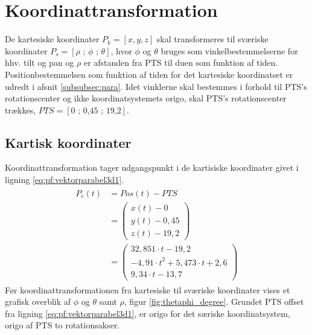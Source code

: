\section{Koordinattransformation}
\label{sec:koordinattransformation}

De kartesiske koordinater \(P_k=[x, y, z]\) skal transformeres til sværiske koordinater \(P_s=[\rho \text{ ; } \phi \text{ ; } \theta]\), hvor \(\phi\) og \(\theta\) bruges som vinkelbestemmelserne for hhv. tilt og pan og \(\rho\) er afstanden fra PTS til duen som funktion af tiden.
Positionbestemmelsen som funktion af tiden for det kartesiske koordinatset er udredt i afsnit \ref{subsubsec:para}.
Idet vinklerne skal bestemmes i forhold til PTS's rotationscenter og ikke koordinatsystemets origo, skal PTS's rotationscenter trækkes, \(PTS=[\text{0 ; 0,45 ; 19,2}]\). 
\subsection{Kartisk koordinater}
Koordinattransformation tager udgangspunkt i de kartisiske koordinater givet i ligning \ref{eq:pf:vektorparabel3d1}. 
\begin{align}
\begin{split}
{ P }_{ c }\left( t \right) &=Pos\left( t \right) -PTS
\\
&=\left( \begin{matrix} x\left( t \right) -0 \\ y\left( t \right) -0,45 \\ z\left( t \right) -19,2 \end{matrix} \right) 
\\ 
&=\left( \begin{matrix} 32,851\cdot t-19,2 \\ -{ 4,91\cdot t }^{ 2 }+5,473\cdot t+2,6 \\ 9,34\cdot t-13,7 \end{matrix} \right) 
\label{eq:pf:vektorparabel3d1}
\end{split}
\end{align}
Før koordinattransformationen fra kartesiske til sværiske koordinater vises et grafisk overblik af \(\phi\) og \(\theta\) samt \(\rho\), figur \ref{fig:thetaphi_degree}. Grundet PTS offset fra ligning \ref{eq:pf:vektorparabel3d1}, er origo for det særiske koordinatsystem, origo af PTS to rotationsakser. 

